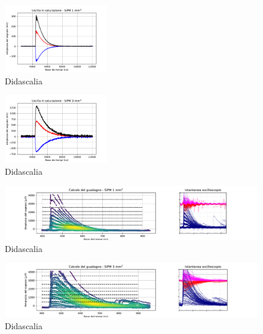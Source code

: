 \documentclass[journal]{IEEEtran}
\begin{document}
\begin{figure}[H]%
\begin{center}
\includegraphics[width=0.40\textwidth]{analysis/output/SiPM_sat_1mm.pdf}
\caption{Didascalia}
\label{fig:oscilloscope}
\end{center}
\end{figure}

\begin{figure}[H]%
\begin{center}
\includegraphics[width=0.40\textwidth]{analysis/output/SiPM_sat_3mm.pdf}
\caption{Didascalia}
\label{fig:oscilloscope}
\end{center}
\end{figure}

\begin{figure}[t]%
\centering
\begin{center}
\includegraphics[width=1.05\textwidth]{analysis/output/SiPM_1mm_gain_staircase.pdf}
\end{center}
\caption{Didascalia}
\label{fig:forces}
\end{figure}

\begin{figure}[t]%
\centering
\begin{center}
\includegraphics[width=1.05\textwidth]{analysis/output/SiPM_3mm_gain_staircase.pdf}
\end{center}
\caption{Didascalia}
\label{fig:forces}
\end{figure}
\end{document}
